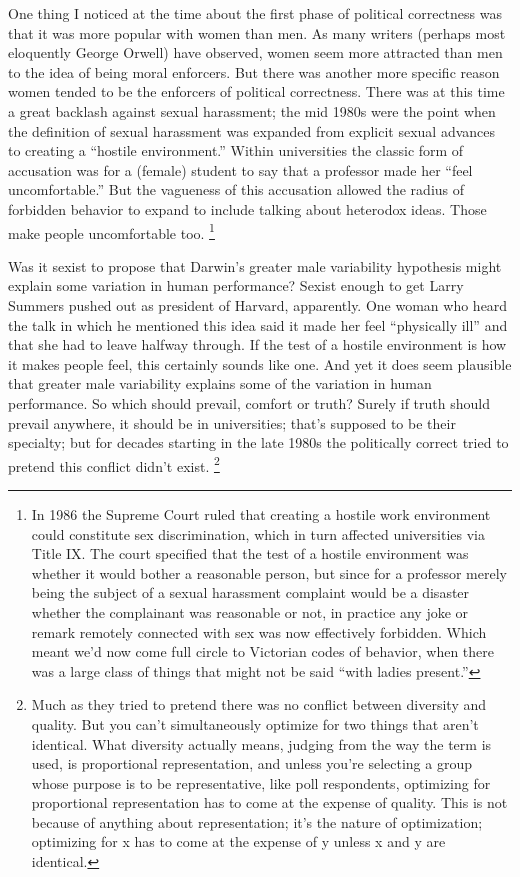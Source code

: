 One thing I noticed at the time about the first phase of political
correctness was that it was more popular with women than men. As many
writers (perhaps most eloquently George Orwell) have observed, women
seem more attracted than men to the idea of being moral enforcers. But
there was another more specific reason women tended to be the enforcers
of political correctness. There was at this time a great backlash
against sexual harassment; the mid 1980s were the point when the
definition of sexual harassment was expanded from explicit sexual
advances to creating a ``hostile environment.'' Within universities the
classic form of accusation was for a (female) student to say that a
professor made her ``feel uncomfortable.'' But the vagueness of this
accusation allowed the radius of forbidden behavior to expand to include
talking about heterodox ideas. Those make people uncomfortable too.
\footnote{In 1986 the Supreme Court ruled that creating a hostile work
environment could constitute sex discrimination, which in turn affected
universities via Title IX. The court specified that the test of a
hostile environment was whether it would bother a reasonable person, but
since for a professor merely being the subject of a sexual harassment
complaint would be a disaster whether the complainant was reasonable or
not, in practice any joke or remark remotely connected with sex was now
effectively forbidden. Which meant we'd now come full circle to
Victorian codes of behavior, when there was a large class of things that
might not be said ``with ladies present.''}

Was it sexist to propose that Darwin's greater male variability
hypothesis might explain some variation in human performance? Sexist
enough to get Larry Summers pushed out as president of Harvard,
apparently. One woman who heard the talk in which he mentioned this idea
said it made her feel ``physically ill'' and that she had to leave
halfway through. If the test of a hostile environment is how it makes
people feel, this certainly sounds like one. And yet it does seem
plausible that greater male variability explains some of the variation
in human performance. So which should prevail, comfort or truth? Surely
if truth should prevail anywhere, it should be in universities; that's
supposed to be their specialty; but for decades starting in the late
1980s the politically correct tried to pretend this conflict didn't
exist. \footnote{Much as they tried to pretend there was no conflict between
diversity and quality. But you can't simultaneously optimize for two
things that aren't identical. What diversity actually means, judging
from the way the term is used, is proportional representation, and
unless you're selecting a group whose purpose is to be representative,
like poll respondents, optimizing for proportional representation has to
come at the expense of quality. This is not because of anything about
representation; it's the nature of optimization; optimizing for x has to
come at the expense of y unless x and y are identical.}

